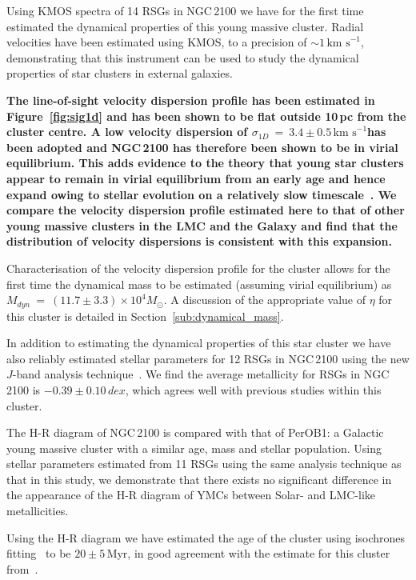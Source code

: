 \documentclass[useAMS,usenatbib]{mn2e}
\def\kms{$\mbox{km s}^{-1}$}
\begin{document}
Using KMOS spectra of 14 RSGs in NGC\,2100 we have for the first time estimated the dynamical properties of this young massive cluster.
Radial velocities have been estimated using KMOS, to a precision of $\sim1$\,\kms, demonstrating that this instrument can be used to study the dynamical properties of star clusters in external galaxies.

\textbf{The line-of-sight velocity dispersion profile has been estimated in Figure~\ref{fig:sig1d} and has been shown to be flat outside 10\,pc from the cluster centre.
A low velocity dispersion of $\sigma_{1D}~=~3.4\pm0.5\,$\kms has been adopted and NGC\,2100 has therefore been shown to be in virial equilibrium.
This adds evidence to the theory that young star clusters appear to remain in virial equilibrium from an early age and hence expand owing to stellar evolution on a relatively slow timescale~\citep[10\,Myr][]{2010ARA&A..48..431P}.
We compare the velocity dispersion profile estimated here to that of other young massive clusters in the LMC and the Galaxy and find that the distribution of velocity dispersions is consistent with this expansion.}

Characterisation of the velocity dispersion profile for the cluster allows for the first time the dynamical mass to be estimated (assuming virial equilibrium) as $M_{dyn}~=~(11.7\pm3.3)\times 10^{4}M_{\odot}$.
A discussion of the appropriate value of $\eta$ for this cluster is detailed in Section~\ref{sub:dynamical_mass}.

In addition to estimating the dynamical properties of this star cluster we have also reliably estimated stellar parameters for 12 RSGs in NGC\,2100 using the new $J$-band analysis technique~\citep{2010MNRAS.407.1203D}.
We find the average metallicity for RSGs in NGC\,2100 is $-0.39\pm0.10\,dex$, which agrees well with previous studies within this cluster.

The H-R diagram of NGC\,2100 is compared with that of PerOB1: a Galactic young massive cluster with a similar age, mass and stellar population.
Using stellar parameters estimated from 11 RSGs using the same analysis technique as that in this study, we demonstrate that there exists no significant difference in the appearance of the H-R diagram of YMCs between Solar- and LMC-like metallicities.

Using the H-R diagram we have estimated the age of the cluster using isochrones fitting~\citep{2012A&A...537A.146E,2013A&A...558A.103G} to be $20\pm5\,$Myr, in good agreement with the estimate for this cluster from~\citet{2015A&A...575A..62N}.
\end{document}
